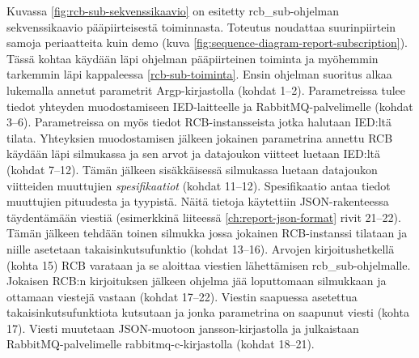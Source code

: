 Kuvassa \ref{fig:rcb-sub-sekvenssikaavio} on esitetty rcb\_sub-ohjelman sekvenssikaavio pääpiirteisestä toiminnasta. Toteutus noudattaa suurinpiirtein samoja periaatteita kuin demo (kuva \ref{fig:sequence-diagram-report-subscription}). Tässä kohtaa käydään läpi ohjelman pääpiirteinen toiminta ja myöhemmin tarkemmin läpi kappaleessa \ref{rcb-sub-toiminta}. Ensin ohjelman suoritus alkaa lukemalla annetut parametrit Argp-kirjastolla (kohdat 1--2). Parametreissa tulee tiedot yhteyden muodostamiseen IED-laitteelle ja RabbitMQ-palvelimelle (kohdat 3--6). Parametreissa on myös tiedot RCB-instansseista jotka halutaan IED:ltä tilata. Yhteyksien muodostamisen jälkeen jokainen parametrina annettu RCB käydään läpi silmukassa ja sen arvot ja datajoukon viitteet luetaan IED:ltä (kohdat 7--12). Tämän jälkeen sisäkkäisessä silmukassa luetaan datajoukon viitteiden muuttujien \emph{spesifikaatiot} (kohdat 11--12). Spesifikaatio antaa tiedot muuttujien pituudesta ja tyypistä. Näitä tietoja käytettiin JSON-rakenteessa täydentämään viestiä (esimerkkinä liiteessä \ref{ch:report-json-format} rivit 21--22). Tämän jälkeen tehdään toinen silmukka jossa jokainen RCB-instanssi tilataan ja niille asetetaan takaisinkutsufunktio (kohdat 13--16). Arvojen kirjoitushetkellä (kohta 15) RCB varataan ja se aloittaa viestien lähettämisen rcb\_sub-ohjelmalle. Jokaisen RCB:n kirjoituksen jälkeen ohjelma jää loputtomaan silmukkaan ja ottamaan viestejä vastaan (kohdat 17--22). Viestin saapuessa asetettua takaisinkutsufunktiota kutsutaan ja jonka parametrina on saapunut viesti (kohta 17). Viesti muutetaan JSON-muotoon jansson-kirjastolla ja julkaistaan RabbitMQ-palvelimelle rabbitmq-c-kirjastolla (kohdat 18--21).

